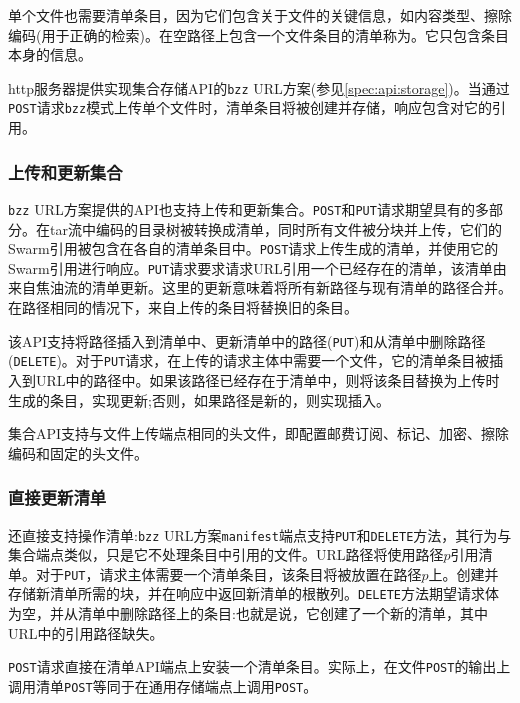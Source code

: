 单个文件也需要清单条目，因为它们包含关于文件的关键信息，如内容类型、擦除编码(用于正确的检索)。在空路径上包含一个文件条目的清单称为。它只包含条目本身的信息。  

http服务器提供实现集合存储API的\lstinline{bzz} URL方案(参见\ref{spec:api:storage})。当通过\lstinline{POST}请求\lstinline{bzz}模式上传单个文件时，清单条目将被创建并存储，响应包含对它的引用。

\subsubsection{上传和更新集合}

\lstinline{bzz} URL方案提供的API也支持上传和更新集合。\lstinline{POST}和\lstinline{PUT}请求期望具有的多部分。在tar流中编码的目录树被转换成清单，同时所有文件被分块并上传，它们的Swarm引用被包含在各自的清单条目中。\lstinline{POST}请求上传生成的清单，并使用它的Swarm引用进行响应。\lstinline{PUT}请求要求请求URL引用一个已经存在的清单，该清单由来自焦油流的清单更新。这里的更新意味着将所有新路径与现有清单的路径合并。在路径相同的情况下，来自上传的条目将替换旧的条目。

该API支持将路径插入到清单中、更新清单中的路径(\lstinline{PUT})和从清单中删除路径(\lstinline{DELETE})。对于\lstinline{PUT}请求，在上传的请求主体中需要一个文件，它的清单条目被插入到URL中的路径中。如果该路径已经存在于清单中，则将该条目替换为上传时生成的条目，实现更新;否则，如果路径是新的，则实现插入。 

集合API支持与文件上传端点相同的头文件，即配置邮费订阅、标记、加密、擦除编码和固定的头文件。

\subsubsection{直接更新清单}

还直接支持操作清单:\lstinline{bzz} URL方案\lstinline{manifest}端点支持\lstinline{PUT}和\lstinline{DELETE}方法，其行为与集合端点类似，只是它不处理条目中引用的文件。URL路径将使用路径$p$引用清单。对于\lstinline{PUT}，请求主体需要一个清单条目，该条目将被放置在路径$p$上。创建并存储新清单所需的块，并在响应中返回新清单的根散列。\lstinline{DELETE}方法期望请求体为空，并从清单中删除路径上的条目:也就是说，它创建了一个新的清单，其中URL中的引用路径缺失。 

\lstinline{POST}请求直接在清单API端点上安装一个清单条目。实际上，在文件\lstinline{POST}的输出上调用清单\lstinline{POST}等同于在通用存储端点上调用\lstinline{POST}。  

